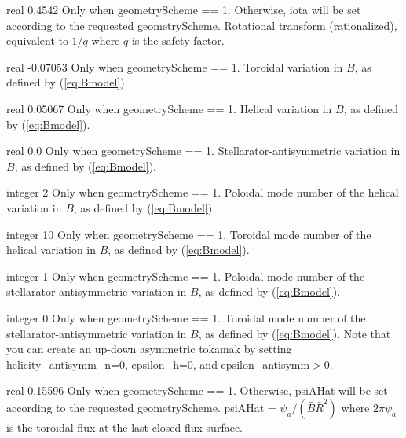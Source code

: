 \myhrule

{real}
{0.4542}
{Only when {\ttfamily geometryScheme} == 1. Otherwise, {\ttfamily iota} will be set according to the requested {\ttfamily geometryScheme}.}
{Rotational transform (rationalized), equivalent to $1/q$ where $q$ is the safety factor.}

\myhrule

{real}
{-0.07053}
{Only when {\ttfamily geometryScheme} == 1.}
{Toroidal variation in $B$, as defined by (\ref{eq:Bmodel}).}

\myhrule

{real}
{0.05067}
{Only when {\ttfamily geometryScheme} == 1.}
{Helical variation in $B$, as defined by (\ref{eq:Bmodel}).}

\myhrule

{real}
{0.0}
{Only when {\ttfamily geometryScheme} == 1.}
{Stellarator-antisymmetric variation in $B$, as defined by (\ref{eq:Bmodel}).}

\myhrule

{integer}
{2}
{Only when {\ttfamily geometryScheme} == 1.}
{Poloidal mode number of the helical variation in $B$, as defined by (\ref{eq:Bmodel}).}

\myhrule

{integer}
{10}
{Only when {\ttfamily geometryScheme} == 1.}
{Toroidal mode number of the helical variation in $B$, as defined by (\ref{eq:Bmodel}).}

\myhrule

{integer}
{1}
{Only when {\ttfamily geometryScheme} == 1.}
{Poloidal mode number of the stellarator-antisymmetric variation in $B$, as defined by (\ref{eq:Bmodel}).}

\myhrule

{integer}
{0}
{Only when {\ttfamily geometryScheme} == 1.}
{Toroidal mode number of the stellarator-antisymmetric variation in $B$, as defined by (\ref{eq:Bmodel}).
Note that you can create an up-down asymmetric tokamak by setting {\ttfamily helicity\_antisymm\_n}=0, {\ttfamily epsilon\_h}=0,
and {\ttfamily epsilon\_antisymm}$>$0.}

\myhrule

{real}
{0.15596}
{Only when {\ttfamily geometryScheme} == 1. Otherwise, {\ttfamily psiAHat} will be set according to the requested {\ttfamily geometryScheme}.}
{{\ttfamily psiAHat} = $\psi_a / (\bar{B} \bar{R}^2)$
where $2 \pi \psi_a$ is the toroidal flux at the last closed flux surface.}

